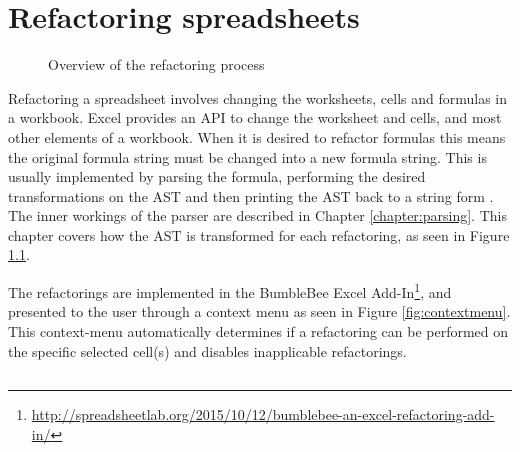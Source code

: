 
\chapter{Refactoring spreadsheets}
\label{chapter:implementingrefactorings}

\noindent
\begin{figure}[h!]
\hspace*{0.003\textwidth}

\caption{Overview of the refactoring process}
\label{fig:chapterrefactoringintrofigure}
\end{figure}

Refactoring a spreadsheet involves changing the worksheets, cells and formulas in a workbook.
Excel provides an API to change the worksheet and cells, and most other elements of a workbook.
When it is desired to refactor formulas this means the original formula string must be changed into a new formula string.
This is usually implemented by parsing the formula, performing the desired transformations on the AST and then printing the AST back to a string form \cite{fowler1999refactoring}.
The inner workings of the parser are described in Chapter \ref{chapter:parsing}.
This chapter covers how the AST is transformed for each refactoring, as seen in Figure \ref{fig:chapterrefactoringintrofigure}.

The refactorings are implemented in the BumbleBee Excel Add-In\footnote{\url{http://spreadsheetlab.org/2015/10/12/bumblebee-an-excel-refactoring-add-in/}}, and presented to the user through a context menu as seen in Figure \ref{fig:contextmenu}.
This context-menu automatically determines if a refactoring can be performed on the specific selected cell(s) and disables inapplicable refactorings.


\newpage

\section{}
\label{refac:extractformula}

